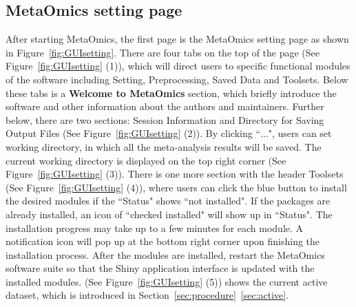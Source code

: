 \subsection{MetaOmics setting page}
\label{sec:setting}
After starting MetaOmics, 
the first page is the MetaOmics setting page as shown in Figure~\ref{fig:GUIsetting}.  
There are four tabs on the top of the page (See Figure~\ref{fig:GUIsetting} {\color{red} (1)}), 
which will direct users to specific functional modules of the software including Setting, Preprocessing, Saved Data and Toolsets.
Below these tabs is a {\bf Welcome to MetaOmics} section, which briefly introduce the software and other information about the authors and maintainers.
Further below, there are two sections: Session Information and Directory for Saving Output Files (See Figure~\ref{fig:GUIsetting} {\color{red} (2)}).
By clicking ``$\ldots$",
users can set working directory, in which all the meta-analysis results will be saved.
The current working directory is displayed on the top right corner (See Figure~\ref{fig:GUIsetting} {\color{red} (3)}).
There is one more section with the header Toolsets (See Figure~\ref{fig:GUIsetting} {\color{red} (4)}),
where users can click the blue button to install the desired modules if the ``Status" shows ``not installed".
If the packages are already installed, an icon of ``checked installed" will show up in ``Status".
The installation progress may take up to a few minutes for each module.
A notification icon will pop up at the bottom right corner upon finishing the installation process. 
After the modules are installed, restart the MetaOmics software suite so that the Shiny application interface is updated with the installed modules.
(See Figure~\ref{fig:GUIsetting} {\color{red} (5)}) shows the current active dataset, 
which is introduced in Section~\ref{sec:procedure}~\ref{sec:active}. 
 
